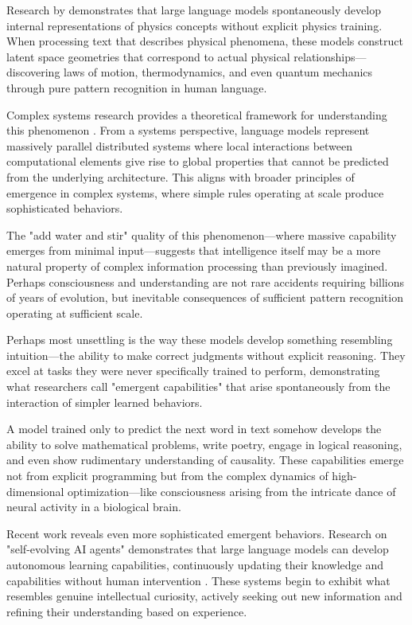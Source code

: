 Research by \textcite{song2025uncovering} demonstrates that large language models spontaneously develop internal representations of physics concepts without explicit physics training. When processing text that describes physical phenomena, these models construct latent space geometries that correspond to actual physical relationships—discovering laws of motion, thermodynamics, and even quantum mechanics through pure pattern recognition in human language.

Complex systems research provides a theoretical framework for understanding this phenomenon \parencite{krakauer2025large}. From a systems perspective, language models represent massively parallel distributed systems where local interactions between computational elements give rise to global properties that cannot be predicted from the underlying architecture. This aligns with broader principles of emergence in complex systems, where simple rules operating at scale produce sophisticated behaviors.

The "add water and stir" quality of this phenomenon—where massive capability emerges from minimal input—suggests that intelligence itself may be a more natural property of complex information processing than previously imagined. Perhaps consciousness and understanding are not rare accidents requiring billions of years of evolution, but inevitable consequences of sufficient pattern recognition operating at sufficient scale.

Perhaps most unsettling is the way these models develop something resembling intuition—the ability to make correct judgments without explicit reasoning. They excel at tasks they were never specifically trained to perform, demonstrating what researchers call "emergent capabilities" that arise spontaneously from the interaction of simpler learned behaviors.

A model trained only to predict the next word in text somehow develops the ability to solve mathematical problems, write poetry, engage in logical reasoning, and even show rudimentary understanding of causality. These capabilities emerge not from explicit programming but from the complex dynamics of high-dimensional optimization—like consciousness arising from the intricate dance of neural activity in a biological brain.

Recent work reveals even more sophisticated emergent behaviors. Research on "self-evolving AI agents" demonstrates that large language models can develop autonomous learning capabilities, continuously updating their knowledge and capabilities without human intervention \parencite{fang2025comprehensive}. These systems begin to exhibit what resembles genuine intellectual curiosity, actively seeking out new information and refining their understanding based on experience.

